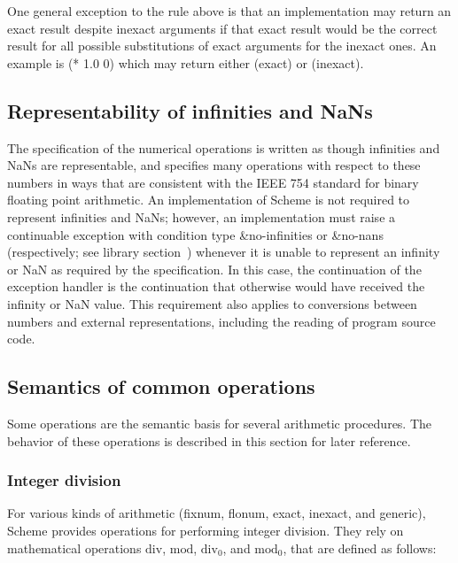 One general exception to the rule above is that an implementation may
return an exact result despite inexact arguments if that exact result
would be the correct result for all possible substitutions of exact
arguments for the inexact ones.  An example is {\cf (* 1.0 0)} which
may return either {} (exact) or {} (inexact).

\subsection{Representability of infinities and NaNs}
\label{infinitiesnanssection}

The specification of the numerical operations is written as though
infinities and NaNs are representable, and specifies many operations
with respect to these numbers in ways that are consistent with the
IEEE 754 standard for binary floating point arithmetic.  
An implementation of Scheme is not required to represent infinities and
NaNs; however,
an implementation must raise a continuable exception with
condition type {\cf\&no-infinities} or {\cf\&no-nans} (respectively;
see library section~)
whenever it is unable to represent an infinity or NaN as required by
the specification.  In this case, the continuation of the exception
handler is the continuation that otherwise would have received
the infinity or NaN value.  This requirement also applies to
conversions between numbers and external representations, including
the reading of program source code.

\subsection{Semantics of common operations}

Some operations are the semantic basis for several arithmetic
procedures.  The behavior of these operations is described in this
section for later reference.

\subsubsection{Integer division}
\label{integerdivision}

For various kinds of arithmetic (fixnum, flonum, exact, inexact, and
generic), Scheme provides operations for performing integer
division.  They rely on mathematical operations $\mathrm{div}$,
$\mathrm{mod}$, $\mathrm{div}_0$, and
$\mathrm{mod}_0$, that are defined as follows:

